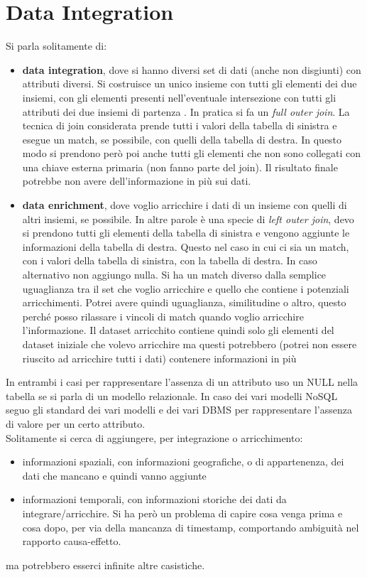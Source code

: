 \section{Data Integration}
Si parla solitamente di:
\begin{itemize}
    \item \textbf{data integration}, dove si hanno diversi set di dati (anche non disgiunti) con attributi diversi. Si costruisce un unico insieme con tutti gli elementi dei due insiemi, con gli elementi presenti nell'eventuale intersezione con tutti gli attributi dei due insiemi di partenza . In pratica si fa un \textit{full outer join}. La tecnica di join considerata prende tutti i valori della tabella di sinistra e esegue un match, se possibile, con quelli della tabella di destra. In questo modo si prendono però poi anche tutti gli elementi che non sono collegati con una chiave esterna primaria (non fanno parte del join). Il risultato finale potrebbe non avere dell'informazione in più sui dati.
    \item \textbf{data enrichment}, dove voglio arricchire i dati di un insieme con quelli di altri insiemi, se possibile. In altre parole è una specie di \textit{left outer join}, devo si prendono tutti gli elementi della tabella di sinistra e vengono aggiunte le informazioni della tabella di destra. Questo nel caso in cui ci sia  un match, con i valori della tabella di sinistra, con la tabella di destra. In caso alternativo non aggiungo nulla. Si ha un match diverso dalla semplice uguaglianza tra il set che voglio arricchire e quello che contiene i potenziali arricchimenti. Potrei avere quindi uguaglianza, similitudine o altro, questo perché posso rilassare i vincoli di match quando voglio arricchire l'informazione. Il dataset arricchito contiene quindi solo gli elementi del dataset iniziale che volevo arricchire ma questi potrebbero (potrei non essere riuscito ad arricchire tutti i dati) contenere informazioni in più
\end{itemize}
In entrambi i casi per rappresentare l'assenza di un attributo uso un NULL nella tabella se si parla di un modello relazionale. In caso dei vari modelli NoSQL
seguo gli standard dei vari modelli e dei vari DBMS per rappresentare l'assenza di valore per un certo attributo.\\
Solitamente si cerca di aggiungere, per integrazione o arricchimento:
\begin{itemize}
    \item informazioni spaziali, con informazioni geografiche, o di appartenenza, dei dati che mancano e quindi vanno aggiunte
    \item informazioni temporali, con informazioni storiche dei dati da integrare/arricchire. Si ha però un problema di capire cosa venga prima e cosa dopo, per via della mancanza di timestamp, comportando ambiguità nel rapporto causa-effetto.
\end{itemize}
ma potrebbero esserci infinite altre casistiche.\\

